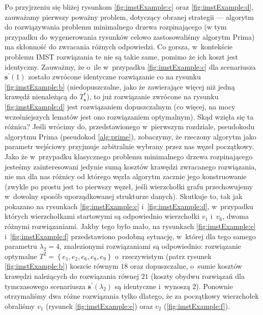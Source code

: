 Po przyjrzeniu się bliżej rysunkom \ref{fig:imstExample:c} oraz \ref{fig:imstExample:d}, zauważamy pierwszy poważny problem, dotyczący obranej strategii --- algorytm do rozwiązywania problemu minimalnego drzewa rozpinającego (w tym przypadku do wygenerowania rysunków celowo zastosowaliśmy algorytm Prima) ma skłonność do zwracania różnych odpowiedzi.
Co gorsza, w~kontekście problemu \textsc{IMST} rozwiązania te nie są takie same, pomimo że ich koszt jest identyczny.
Zauważmy, że o~ile w~przypadku \ref{fig:imstExample:c} dla scenariusza $\textbf{s}^{\prime} \left( 1 \right)$ zostało zwrócone identyczne rozwiązanie co na rysunku \ref{fig:imstExample:b} (niedopuszczalne, jako że zawierające więcej niż jedną krawędź nienależącą do $T^{\ast}_{\textbf{s}}$), to już rozwiązanie zwrócone na rysunku \ref{fig:imstExample:d} jest rozwiązaniem dopuszczalnym (co więcej, na mocy wcześniejszych lematów jest ono rozwiązaniem optymalnym).
Skąd wzięła się ta różnica?
Jeśli wrócimy do, przedstawionego w~pierwszym rozdziale, pseudokodu algorytmu Prima (pseudokod \ref{alg:prime}), zobaczymy, że rzeczony algorytm jako parametr wejściowy przyjmuje arbitralnie wybrany przez nas węzeł początkowy.
Jako że w~przypadku klasycznego problemu minimalnego drzewa rozpinającego jesteśmy zainteresowani jedynie sumą kosztów krawędzi zwracanego rozwiązania, nie ma dla nas różnicy od którego węzła algorytm zacznie jego konstruowanie (zwykle po prostu jest to pierwszy węzeł, jeśli wierzchołki grafu przechowujemy w~dowolny sposób uporządkowanej strukturze danych).
Skutkuje to, tak jak pokazano na rysunkach \ref{fig:imstExample:c} i~\ref{fig:imstExample:d}, w~przypadku których wierzchołkami startowymi są odpowiednio wierzchołki $v_{1}$ i~$v_{6}$, dwoma różnymi rozwiązaniami.
Jakby tego było mało, na rysunkach \ref{fig:imstExample:e} i~\ref{fig:imstExample:f} przedstawiono podobną sytuację, w~której dla tego samego parametru $\lambda_{2} = 4$, znalezionymi rozwiązaniami są odpowiednio: rozwiązanie optymalne $T^{2} = \left\{ e_{1}, e_{2}, e_{6}, e_{8}, e_{9} \right\}$ o~rzeczywistym (patrz rysunek \ref{fig:imstExample:b}) koszcie równym $18$ oraz dopuszczalne, o~sumie kosztów krawędzi należących do rozwiązania równej $21$ (koszty obydwu rozwiązań dla tymczasowego scenariusza $\textbf{s}^{\prime} \left( \lambda_{2} \right)$ są identyczne i~wynoszą $2$).
Ponownie otrzymaliśmy dwa różne rozwiązania tylko dlatego, że za początkowy wierzchołek obraliśmy $v_{1}$ (rysunek \ref{fig:imstExample:e}) oraz $v_{2}$ (\ref{fig:imstExample:f}).

